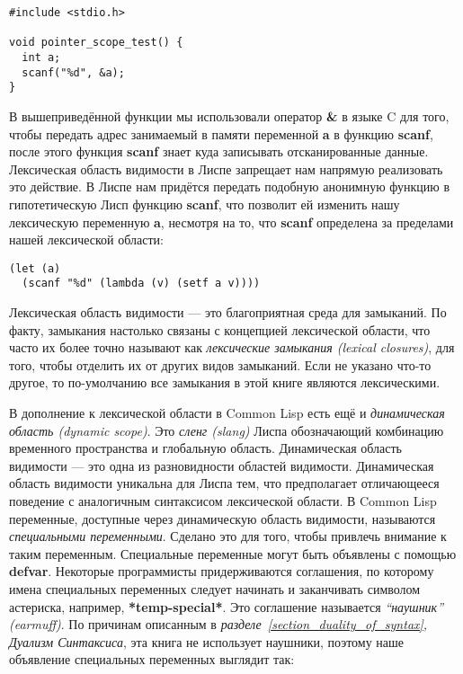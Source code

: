 \begin{verbatim}
#include <stdio.h>

void pointer_scope_test() {
  int a;
  scanf("%d", &a);
}
\end{verbatim}

В вышеприведённой функции мы использовали оператор \textbf{\&} в языке C для того, чтобы передать адрес занимаемый в памяти переменной \textbf{a} в функцию \textbf{scanf}, после этого функция \textbf{scanf} знает куда записывать отсканированные данные. Лексическая область видимости в Лиспе запрещает нам напрямую реализовать это действие. В Лиспе нам придётся передать подобную анонимную функцию в гипотетическую Лисп функцию \textbf{scanf}, что позволит ей изменить нашу лексическую переменную \textbf{a}, несмотря на то, что \textbf{scanf} определена за пределами нашей лексической области:

\begin{verbatim}
(let (a)
  (scanf "%d" (lambda (v) (setf a v))))
\end{verbatim}

Лексическая область видимости --- это благоприятная среда для замыканий. По факту, замыкания настолько связаны с концепцией лексической области, что часто их более точно называют как \emph{лексические замыкания (lexical closures)}, для того, чтобы отделить их от других видов замыканий. Если не указано что-то другое, то по-умолчанию все замыкания в этой книге являются лексическими.

В дополнение к лексической области в Common Lisp есть ещё и \emph{динамическая область (dynamic scope)}. Это \emph{сленг (slang)} Лиспа обозначающий комбинацию временного пространства и глобальную область. Динамическая область видимости --- это одна из разновидности областей видимости. Динамическая область видимости уникальна для Лиспа тем, что предполагает отличающееся поведение с аналогичным синтаксисом лексической области. В Common Lisp переменные, доступные через динамическую область видимости, называются \emph{специальными переменными}. Сделано это для того, чтобы привлечь внимание к таким переменным. Специальные переменные могут быть объявлены с помощью \textbf{defvar}. Некоторые программисты придерживаются соглашения, по которому имена специальных переменных следует начинать и заканчивать символом астериска, например, \textbf{*temp-special*}. Это соглашение называется \emph{``наушник'' (earmuff)}. По причинам описанным в \emph{разделе~\ref{section_duality_of_syntax}, Дуализм Синтаксиса}, эта книга не использует наушники, поэтому наше объявление специальных переменных выглядит так:

